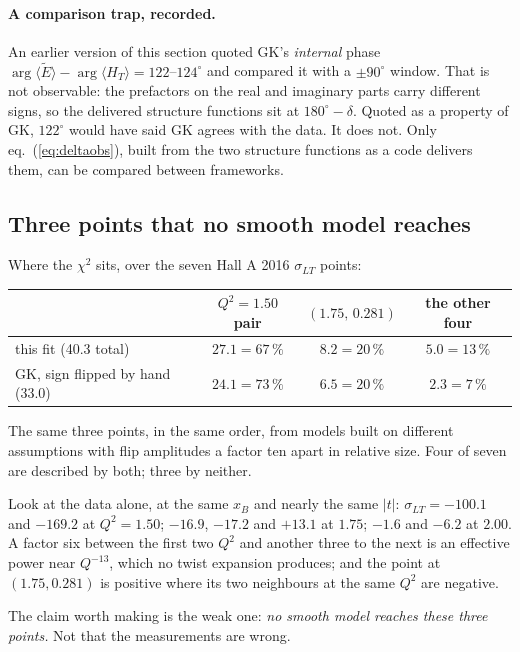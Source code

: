 \documentclass[11pt,a4paper]{article}
\newcommand{\sig}[1]{\sigma_{#1}}
\begin{document}
\paragraph{A comparison trap, recorded.}  An earlier version of this section
quoted GK's \emph{internal} phase $\arg\langle\tilde E\rangle -
\arg\langle H_T\rangle = 122$--$124^\circ$ and compared it with a $\pm
90^\circ$ window.  That is not observable: the prefactors on the real and
imaginary parts carry different signs, so the delivered structure functions sit
at $180^\circ - \delta$.  Quoted as a property of GK, $122^\circ$ would have
said GK agrees with the data.  It does not.  Only
eq.~(\ref{eq:deltaobs}), built from the two structure functions as a code
delivers them, can be compared between frameworks.

\subsection{Three points that no smooth model reaches}

Where the $\chi^2$ sits, over the seven Hall A 2016 $\sig{LT}$ points:

\begin{center}
\begin{tabular}{lccc}
\toprule
& $Q^2 = 1.50$ pair & $(1.75,\,0.281)$ & the other four\\
\midrule
this fit (40.3 total) & $27.1 = 67\,\%$ & $8.2 = 20\,\%$ & $5.0 = 13\,\%$\\
GK, sign flipped by hand (33.0) & $24.1 = 73\,\%$ & $6.5 = 20\,\%$ & $2.3 = 7\,\%$\\
\bottomrule
\end{tabular}
\end{center}

The same three points, in the same order, from models built on different
assumptions with flip amplitudes a factor ten apart in relative size.  Four of
seven are described by both; three by neither.

Look at the data alone, at the same $x_B$ and nearly the same $|t|$:
$\sig{LT} = -100.1$ and $-169.2$ at $Q^2 = 1.50$; $-16.9$, $-17.2$ and
$\mathbf{+13.1}$ at $1.75$; $-1.6$ and $-6.2$ at $2.00$.  A factor six between
the first two $Q^2$ and another three to the next is an effective power near
$Q^{-13}$, which no twist expansion produces; and the point at $(1.75, 0.281)$
is positive where its two neighbours at the same $Q^2$ are negative.

The claim worth making is the weak one: \emph{no smooth model reaches these
three points.}  Not that the measurements are wrong.
\end{document}
